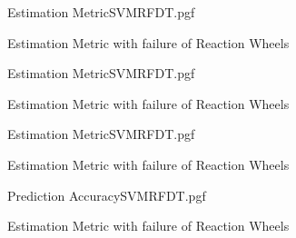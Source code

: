 \begin{figure}[!htb]
	\centering
	
	{Estimation MetricSVMRFDT.pgf}
	
	\caption{Estimation Metric with failure of Reaction Wheels}
	\label{fig:catastrophicReactionWheels}
\end{figure}

\begin{figure}[!htb]
	\centering
	
	{Estimation MetricSVMRFDT.pgf}
	
	\caption{Estimation Metric with failure of Reaction Wheels}
	\label{fig:catastrophicReactionWheels}
\end{figure}

\begin{figure}[!htb]
	\centering
	
	{Estimation MetricSVMRFDT.pgf}
	
	\caption{Estimation Metric with failure of Reaction Wheels}
	\label{fig:catastrophicReactionWheels}
\end{figure}

\begin{figure}[!htb]
	\centering
	
	{Prediction AccuracySVMRFDT.pgf}
	
	\caption{Estimation Metric with failure of Reaction Wheels}
	\label{fig:catastrophicReactionWheels}
\end{figure}
%
%	
%	

